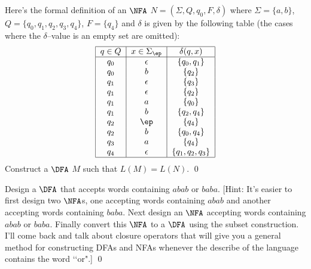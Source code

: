 \newpage
\begin{ex}
Here's the formal definition of an $\NFA$ $N = (\Sigma, Q, q_0, F,
\delta)$ where $\Sigma=\{a,b\}$, $Q = \{q_0, q_1, q_2, q_3, q_4\}$,
$F = \{q_4\}$ and $\delta$ is given by the following table
(the cases where the $\delta$--value is an empty set are omitted):
\[
 \begin{tabular}{|c|c|c|}
  \hline
  $q \in Q$ & $x \in \Sigma_\ep$ & $\delta(q,x)$ \\
  \hline
  $q_0$ & $\epsilon$ & $\{q_0, q_1\}$ \\
  $q_0$ & $b$ & $\{q_2\}$ \\
  $q_1$ & $\epsilon$ & $\{q_3\}$ \\
  $q_1$ & $\epsilon$ & $\{q_2\}$ \\
  $q_1$ & $a$ & $\{q_0\}$ \\
  $q_1$ & $b$ & $\{q_2, q_4\}$ \\
  $q_2$ & $\ep$ & $\{q_4\}$ \\
  $q_2$ & $b$ & $\{q_0,q_4\}$ \\
  $q_3$ & $a$ & $\{q_4\}$ \\
  $q_4$ & $\epsilon$ & $\{q_1, q_2, q_3\}$ \\
  \hline
 \end{tabular}
\]
Construct a $\DFA$ $M$ such that $L(M) = L(N)$.
\qed
\end{ex}



\newpage
\begin{ex}
Design a $\DFA$ that accepts words containing $abab$ or $baba$.
[Hint: It's easier to first design two $\NFA$s, one accepting
words containing $abab$ and another accepting words containing
$baba$.
Next design an $\NFA$ accepting words containing $abab$ or $baba$.
Finally convert this $\NFA$ to a $\DFA$ using the subset construction.
I'll come back and talk about closure operators that will give
you a general method for constructing DFAs and NFAs whenever
the describe of the language contains the word \lq\lq or".]
\qed
\end{ex}
